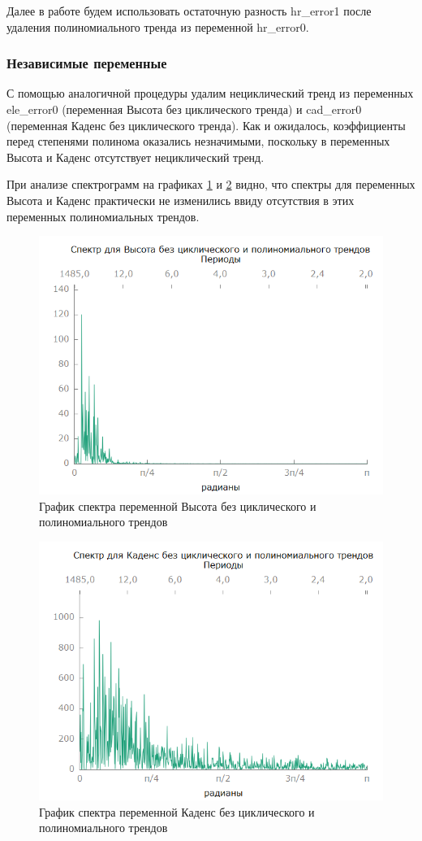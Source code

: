 \documentclass[a4paper,12pt]{article}
\begin{document}
Далее в работе будем использовать остаточную разность hr\_error1 после удаления полиномиального тренда из переменной hr\_error0.

\subsubsection{Независимые переменные}

С помощью аналогичной процедуры удалим нециклический тренд из переменных ele\_error0 (переменная Высота без циклического тренда) и cad\_error0 (переменная Каденс без циклического тренда). Как и ожидалось, коэффициенты перед степенями полинома оказались незначимыми, поскольку в переменных Высота и Каденс отсутствует нециклический тренд.

При анализе спектрограмм на графиках \ref{fig:ele_error1_spectr} и \ref{fig:cad_error1_spectr} видно, что спектры для переменных Высота и Каденс практически не изменились ввиду отсутствия в этих переменных полиномиальных трендов.

\begin{figure}[H]
	\centering
	\includegraphics[width=0.5\linewidth]{../[graphics]/ele_error1_spectr.png}
	\caption{График спектра переменной Высота без циклического и полиномиального трендов}
	\label{fig:ele_error1_spectr}
\end{figure}

\begin{figure}[H]
	\centering
	\includegraphics[width=0.5\linewidth]{../[graphics]/cad_error1_spectr.png}
	\caption{График спектра переменной Каденс без циклического и полиномиального трендов}
	\label{fig:cad_error1_spectr}
\end{figure}
\end{document}
